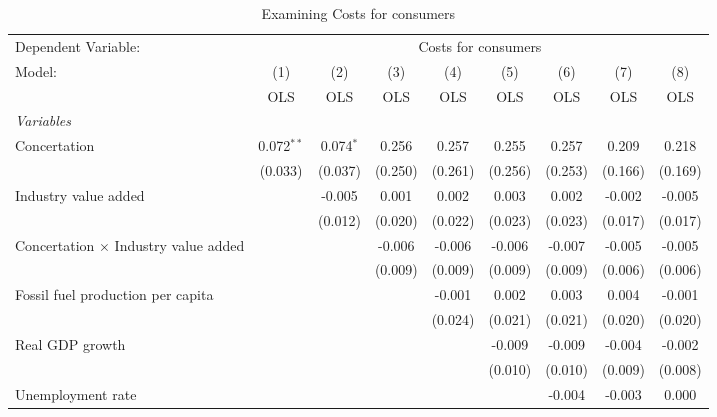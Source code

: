 
\begin{table}[htbp]
   \caption{Examining Costs for consumers}
   \centering
   \begin{tabular}{lcccccccc}
      \toprule
      Dependent Variable: & \multicolumn{8}{c}{Costs for consumers}\\
      Model:                                      & (1)          & (2)         & (3)     & (4)     & (5)     & (6)     & (7)     & (8)\\  
                                                  &  OLS         & OLS         & OLS     & OLS     & OLS     & OLS     & OLS     & OLS\\  
      \midrule
      \emph{Variables}\\
      Concertation                                & 0.072$^{**}$ & 0.074$^{*}$ & 0.256   & 0.257   & 0.255   & 0.257   & 0.209   & 0.218\\   
                                                  & (0.033)      & (0.037)     & (0.250) & (0.261) & (0.256) & (0.253) & (0.166) & (0.169)\\   
      Industry value added                        &              & -0.005      & 0.001   & 0.002   & 0.003   & 0.002   & -0.002  & -0.005\\   
                                                  &              & (0.012)     & (0.020) & (0.022) & (0.023) & (0.023) & (0.017) & (0.017)\\   
      Concertation $\times$ Industry value added  &              &             & -0.006  & -0.006  & -0.006  & -0.007  & -0.005  & -0.005\\   
                                                  &              &             & (0.009) & (0.009) & (0.009) & (0.009) & (0.006) & (0.006)\\   
      Fossil fuel production per capita           &              &             &         & -0.001  & 0.002   & 0.003   & 0.004   & -0.001\\   
                                                  &              &             &         & (0.024) & (0.021) & (0.021) & (0.020) & (0.020)\\   
      Real GDP growth                             &              &             &         &         & -0.009  & -0.009  & -0.004  & -0.002\\   
                                                  &              &             &         &         & (0.010) & (0.010) & (0.009) & (0.008)\\   
      Unemployment rate                           &              &             &         &         &         & -0.004  & -0.003  & 0.000\\   

\end{tabular}
\end{table}
